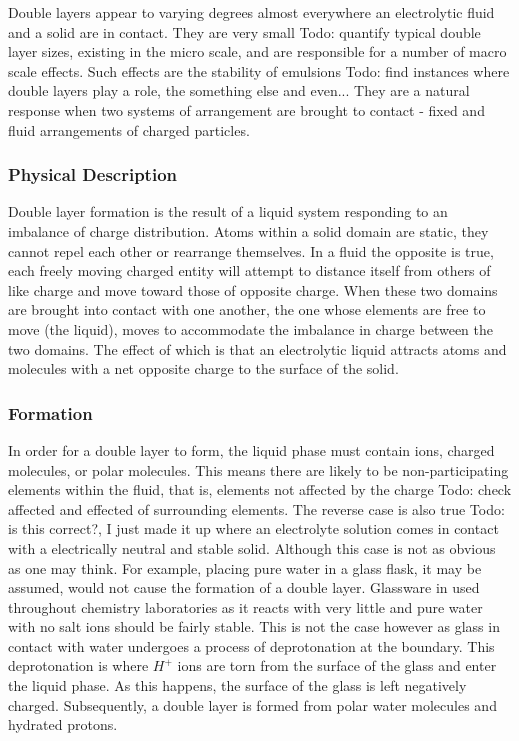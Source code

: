 {Double layers appear to varying degrees almost everywhere an electrolytic fluid and a solid are in contact. They are very small {Todo: quantify typical double layer sizes}, existing in the micro scale, and are responsible for a number of macro scale effects. Such effects are the stability of emulsions {Todo: find instances where double layers play a role}, the something else and even... They are a natural response when two systems of arrangement are brought to contact - fixed and fluid arrangements of charged particles.

\subsubsection{Physical Description}
    Double layer formation is the result of a liquid system responding to an imbalance of charge distribution. Atoms within a solid domain are static, they cannot repel each other or rearrange themselves. In a fluid the opposite is true, each freely moving charged entity will attempt to distance itself from others of like charge and move toward those of opposite charge. When these two domains are brought into contact with one another, the one whose elements are free to move (the liquid), moves to accommodate the imbalance in charge between the two domains. The effect of which is that an electrolytic liquid attracts atoms and molecules with a net opposite charge to the surface of the solid.

\subsubsection{Formation}
    {\color{blue}
    In order for a double layer to form, the liquid phase must contain ions, charged molecules, or polar molecules.
    This means there are likely to be non-participating elements within the fluid, that is, elements not affected by the charge {Todo: check affected and effected} of surrounding elements.
    The reverse case is also true {Todo: is this correct?, I just made it up} where an electrolyte solution comes in contact with a electrically neutral and stable solid. Although this case is not as obvious as one may think. For example, placing pure water in a glass flask, it may be assumed, would not cause the formation of a double layer. Glassware in used throughout chemistry laboratories as it reacts with very little and pure water with no salt ions should be fairly stable. This is not the case however as glass in contact with water undergoes a process of deprotonation at the boundary. This deprotonation is where $H^{+}$ ions are torn from the surface of the glass and enter the liquid phase. As this happens, the surface of the glass is left negatively charged. Subsequently, a double layer is formed from polar water molecules and hydrated protons.
    }



}
